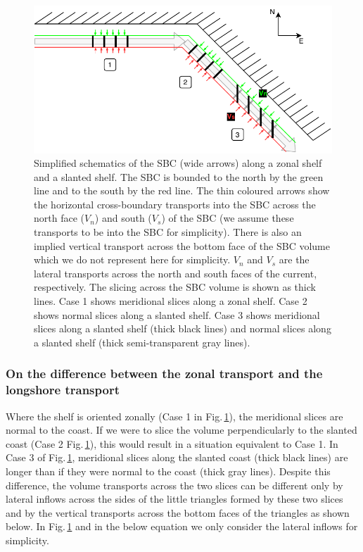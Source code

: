 \documentclass[preprint,3p,review,12pt]{elsarticle}
\begin{document}
\begin{figure}[hbp]
    \includegraphics[width=1\textwidth, height=1\textheight, keepaspectratio]{slices.pdf}
    \caption{\label{slices}%
    Simplified schematics of the SBC (wide arrows) along a zonal shelf and a slanted shelf. The SBC is bounded to the north by the green line and to the south by the red line. The thin coloured arrows show the horizontal cross-boundary transports into the SBC across the north face ($V_n$) and south ($V_s$) of the SBC (we assume these transports to be into the SBC for simplicity). There is also an implied vertical transport across the bottom face of the SBC volume which we do not represent here for simplicity. $V_n$ and $V_s$ are the lateral transports across the north and south faces of the current, respectively. The slicing across the SBC volume is shown as thick lines. Case 1 shows meridional slices along a zonal shelf. Case 2 shows normal slices along a slanted shelf. Case 3 shows meridional slices along a slanted shelf (thick black lines) and normal slices along a slanted shelf (thick semi-transparent gray lines).}
\end{figure}

\subsubsection{On the difference between the zonal transport and the longshore transport}
Where the shelf is oriented zonally (Case 1 in Fig.\,\ref{slices}), the meridional slices are normal to the coast. If we were to slice the volume perpendicularly to the slanted coast (Case 2 Fig.\,\ref{slices}), this would result in a situation equivalent to Case 1. In Case 3 of Fig.\,\ref{slices}, meridional slices along the slanted coast (thick black lines) are longer than if they were normal to the coast (thick gray lines). Despite this difference, the volume transports across the two slices can be different only by lateral inflows across the sides of the little triangles formed by these two slices and by the vertical transports across the bottom faces of the triangles as shown below. In Fig.\,\ref{slices} and in the below equation we only consider the lateral inflows for simplicity.
\end{document}
